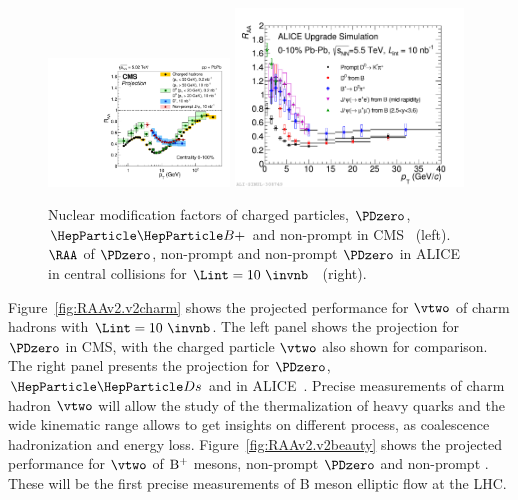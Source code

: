 \begin{figure}[ht]
  \begin{center}
    \includegraphics[width=0.43\textwidth]{hf/figures/cRAA_lumiTG_10_lumiMB_0_v2_right.pdf}
   \includegraphics[width=0.54\textwidth]{hf/figures/ALICEUpgrade_charmbeautyRAA.pdf}
    \caption{Nuclear modification factors of charged particles, $\PDzero$, $\PBp$ and non-prompt \PJGy in CMS~\cite{CMS-PAS-FTR-17-002} (left). $\RAA$ of $\PDzero$, non-prompt \PJGy and non-prompt $\PDzero$ in ALICE in central \PbPb collisions for $\Lint=10~\invnb$~\cite{Abelev:1625842} (right).}
    \label{fig:RAAv2.RAA}
  \end{center}
\end{figure}


Figure~\ref{fig:RAAv2.v2charm} shows the projected performance for $\vtwo$ of charm hadrons with $\Lint=10~\invnb$. The left panel shows the projection for $\PDzero$ in CMS, with the charged particle $\vtwo$ also shown for comparison. The right panel presents the projection for $\PDzero$, $\PDs$ and \PGLc in ALICE~\cite{Abelev:1625842}. Precise measurements of charm hadron $\vtwo$ will allow the study of the thermalization of heavy quarks and the wide kinematic range allows to get insights on different process, as coalescence hadronization and energy loss. Figure~\ref{fig:RAAv2.v2beauty} shows the projected performance for $\vtwo$ of $\rm B^+$ mesons, non-prompt $\PDzero$ and non-prompt \PJGy. These will be the first precise measurements of B meson elliptic flow at the LHC.

